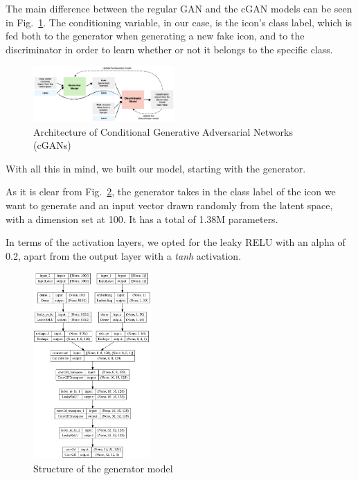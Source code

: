\documentclass[conference]{IEEEtran}
\begin{document}
The main difference between the regular GAN and the cGAN models can be seen in Fig.~\ref{fig:cGANArch}. The conditioning variable, in our case, is the icon's class label, which is fed both to the generator when generating a new fake icon, and to the discriminator in order to learn whether or not it belongs to the specific class.

\begin{figure}[htbp]
    \centering
    \includegraphics[width=0.48\textwidth]{paper/images/architecture/cgan_arch.png}
    \caption{Architecture of Conditional Generative Adversarial Networks (cGANs)}
    \label{fig:cGANArch}
\end{figure}

With all this in mind, we built our model, starting with the generator. 

As it is clear from Fig.~\ref{fig:GenStruct}, the generator takes in the class label of the icon we want to generate and an input vector drawn randomly from the latent space, with a dimension set at 100. It has a total of 1.38M parameters.

In terms of the activation layers, we opted for the leaky RELU with an alpha of 0.2, apart from the output layer with a \textit{tanh} activation.

\begin{figure}[htbp]
    \centering
    \includegraphics[width=0.4\textwidth]{paper/images/summary/generator.png}
    \caption{Structure of the generator model}
    \label{fig:GenStruct}
\end{figure}
\end{document}
